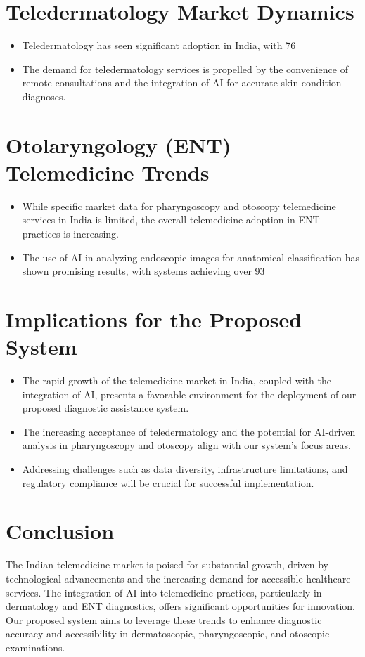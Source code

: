 \section{Teledermatology Market Dynamics}

\begin{itemize}
\item Teledermatology has seen significant adoption in India, with 76%
\item The demand for teledermatology services is propelled by the convenience of remote consultations and the integration of AI for accurate skin condition diagnoses.
\end{itemize}

\section{Otolaryngology (ENT) Telemedicine Trends}

\begin{itemize}
\item While specific market data for pharyngoscopy and otoscopy telemedicine services in India is limited, the overall telemedicine adoption in ENT practices is increasing.
\item The use of AI in analyzing endoscopic images for anatomical classification has shown promising results, with systems achieving over 93%
\end{itemize}

\section{Implications for the Proposed System}

\begin{itemize}
\item The rapid growth of the telemedicine market in India, coupled with the integration of AI, presents a favorable environment for the deployment of our proposed diagnostic assistance system.
\item The increasing acceptance of teledermatology and the potential for AI-driven analysis in pharyngoscopy and otoscopy align with our system's focus areas.
\item Addressing challenges such as data diversity, infrastructure limitations, and regulatory compliance will be crucial for successful implementation.
\end{itemize}

\section{Conclusion}

The Indian telemedicine market is poised for substantial growth, driven by technological advancements and the increasing demand for accessible healthcare services. The integration of AI into telemedicine practices, particularly in dermatology and ENT diagnostics, offers significant opportunities for innovation. Our proposed system aims to leverage these trends to enhance diagnostic accuracy and accessibility in dermatoscopic, pharyngoscopic, and otoscopic examinations.